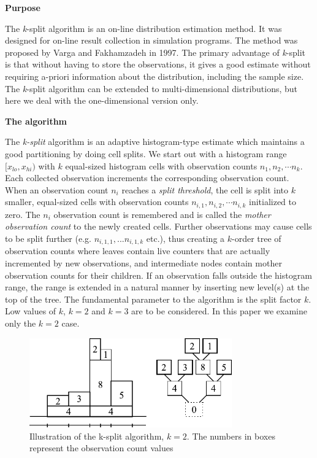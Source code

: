 \textbf{Purpose}


The \textit{k}-split algorithm is an on-line distribution
estimation method.  It was
designed for on-line result collection in simulation programs.  The
method was proposed by Varga and Fakhamzadeh in 1997. The primary
advantage of \textit{k}-split is that without having to store the
observations, it gives a good estimate without requiring a-priori
information about the distribution, including the sample size. The
\textit{k}-split algorithm can be extended to multi-dimensional
distributions, but here we deal
with the one-dimensional version only.


\textbf{The algorithm}


The \textit{k-split} algorithm is an adaptive histogram-type estimate which
maintains a good partitioning by doing cell splits. We start out with
a histogram range $[x_{lo}, x_{hi})$ with $k$ equal-sized histogram
cells with observation counts $n_1,n_2, \cdots n_k$.  Each collected
observation increments the corresponding observation count. When an
observation count $n_i$ reaches a \textit{split threshold}, the cell
is split into $k$ smaller, equal-sized cells with observation counts
$n_{i,1}, n_{i,2}, \cdots n_{i,k}$ initialized to zero. The $n_i$
observation count is remembered and is called the \textit{mother
  observation count} to the newly created cells. Further observations
may cause cells to be split further (e.g. $n_{i,1,1},...n_{i,1,k}$
etc.), thus creating a $k$-order tree of observation counts where
leaves contain live counters that are actually incremented by new
observations, and intermediate nodes contain mother observation counts
for their children. If an observation falls outside the histogram
range, the range is extended in a natural manner by inserting new
level(s) at the top of the tree. The fundamental parameter to the
algorithm is the split factor $k$. Low values of $k$, $k=2$ and $k=3$
are to be considered. In this paper we examine only the $k=2$ case.

\begin{figure}[htbp]
  \begin{center}
    \includegraphics[width=3.442in, height=1.518in]{figures/usmanFig15}
    \caption{Illustration of the k-split algorithm, $k=2$. The
      numbers in boxes represent the observation count values}
  \end{center}
\end{figure}


